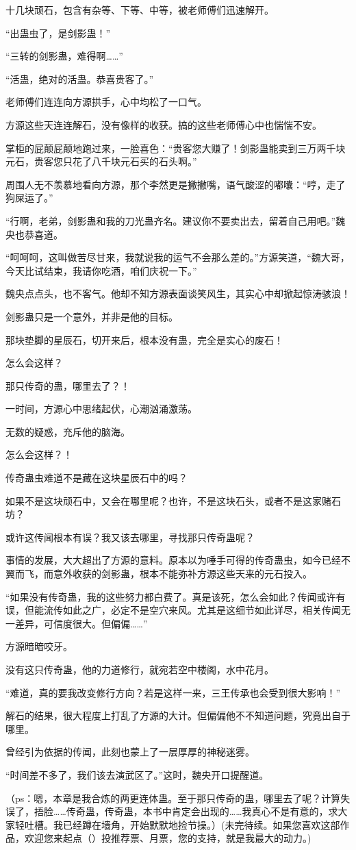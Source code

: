 \begin{this_body}
十几块顽石，包含有杂等、下等、中等，被老师傅们迅速解开。

“出蛊虫了，是剑影蛊！”

“三转的剑影蛊，难得啊……”

“活蛊，绝对的活蛊。恭喜贵客了。”

老师傅们连连向方源拱手，心中均松了一口气。

方源这些天连连解石，没有像样的收获。搞的这些老师傅心中也惴惴不安。

掌柜的屁颠屁颠地跑过来，一脸喜色：“贵客您大赚了！剑影蛊能卖到三万两千块元石，贵客您只花了八千块元石买的石头啊。”

周围人无不羡慕地看向方源，那个李然更是撇撇嘴，语气酸涩的嘟囔：“哼，走了狗屎运了。”

“行啊，老弟，剑影蛊和我的刀光蛊齐名。建议你不要卖出去，留着自己用吧。”魏央也恭喜道。

“呵呵呵，这叫做苦尽甘来，我就说我的运气不会那么差的。”方源笑道，“魏大哥，今天比试结束，我请你吃酒，咱们庆祝一下。”

魏央点点头，也不客气。他却不知方源表面谈笑风生，其实心中却掀起惊涛骇浪！

剑影蛊只是一个意外，并非是他的目标。

那块垫脚的星辰石，切开来后，根本没有蛊，完全是实心的废石！

怎么会这样？

那只传奇的蛊，哪里去了？！

一时间，方源心中思绪起伏，心潮汹涌激荡。

无数的疑惑，充斥他的脑海。

怎么会这样？！

传奇蛊虫难道不是藏在这块星辰石中的吗？

如果不是这块顽石中，又会在哪里呢？也许，不是这块石头，或者不是这家赌石坊？

或许这传闻根本有误？我又该去哪里，寻找那只传奇蛊呢？

事情的发展，大大超出了方源的意料。原本以为唾手可得的传奇蛊虫，如今已经不翼而飞，而意外收获的剑影蛊，根本不能弥补方源这些天来的元石投入。

“如果没有传奇蛊，我的这些努力都白费了。真是该死，怎么会如此？传闻或许有误，但能流传如此之广，必定不是空穴来风。尤其是这细节如此详尽，相关传闻无一差异，可信度很大。但偏偏……”

方源暗暗咬牙。

没有这只传奇蛊，他的力道修行，就宛若空中楼阁，水中花月。

“难道，真的要我改变修行方向？若是这样一来，三王传承也会受到很大影响！”

解石的结果，很大程度上打乱了方源的大计。但偏偏他不不知道问题，究竟出自于哪里。

曾经引为依据的传闻，此刻也蒙上了一层厚厚的神秘迷雾。

“时间差不多了，我们该去演武区了。”这时，魏央开口提醒道。

（ps：嗯，本章是我合炼的两更连体蛊。至于那只传奇的蛊，哪里去了呢？计算失误了，捂脸……传奇蛊，传奇蛊，本书中肯定会出现的……我真心不是有意的，求大家轻吐槽。我已经蹲在墙角，开始默默地捡节操。）(未完待续。如果您喜欢这部作品，欢迎您来起点（）投推荐票、月票，您的支持，就是我最大的动力。)

\end{this_body}

